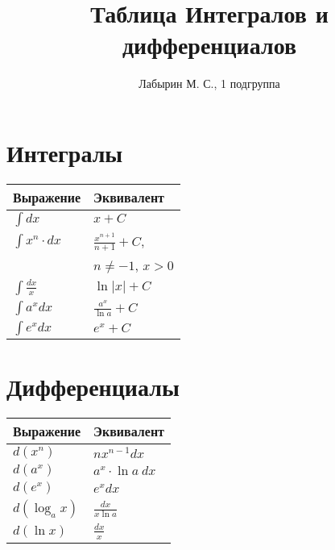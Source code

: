 \documentclass[12pt]{article}
\author{Лабырин М. С., 1 подгруппа}
\title{Таблица Интегралов и дифференциалов}
\begin{document}
\maketitle

\begin{multicols}{2}

  \section*{Интегралы}

  \begin{tabular}{ || l | l || }
    \hline
    Выражение & Эквивалент \\
    \hline

    $\displaystyle\int dx$ & $x + C$ \\[5pt]
    \hline

    $\displaystyle\int x^n \cdot dx$ & $\displaystyle \frac{x^{n + 1}}{n + 1} + C$, \\ &
    $n \neq -1$, $x > 0$ \\
    \hline

    $\displaystyle \int \frac{dx}{x}$ & $\ln |x| + C$ \\[5pt]
    \hline

    $\displaystyle \int a^x dx$ & $\displaystyle \frac{a^x}{\ln a} + C$ \\[5pt]
    \hline

    $\displaystyle \int e^x dx$ & $e^x + C$ \\[5pt]
    \hline
  \end{tabular}

  \columnbreak

  \section*{Дифференциалы}

  \begin{tabular}{ || l | l || }
    \hline
    Выражение & Эквивалент \\
    \hline

    $d(x^n)$ & $nx^{n - 1} dx$ \\
    \hline

    $d(a^x)$ & $a^x \cdot \ln a~dx$ \\
    \hline

    $d(e^x)$ & $e^x dx$ \\
    \hline

    $d(\log_a x)$ & $\displaystyle \frac{dx}{x \ln a}$ \\[5pt]
    \hline

    $d(\ln x)$ & $\displaystyle \frac{dx}{x}$ \\[5pt]
    \hline
  \end{tabular}

\end{multicols}
\end{document}
